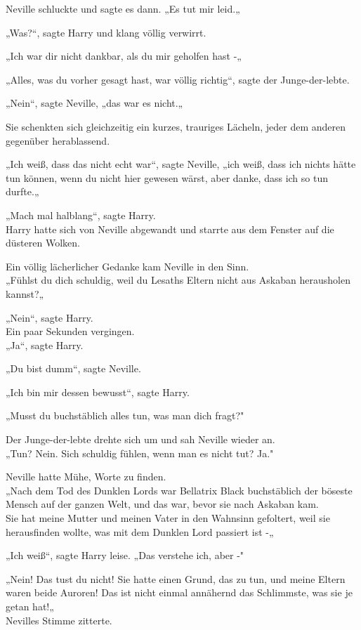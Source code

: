 {Neville schluckte und sagte es dann. „Es tut mir leid.„

„Was?“, sagte Harry und klang völlig verwirrt.

„Ich war dir nicht dankbar, als du mir geholfen hast -„

„Alles, was du vorher gesagt hast, war völlig richtig“, sagte der Junge-der-lebte.

„Nein“, sagte Neville, „das war es nicht.„

Sie schenkten sich gleichzeitig ein kurzes, trauriges Lächeln, jeder dem anderen gegenüber herablassend.

„Ich weiß, dass das nicht echt war“, sagte Neville, „ich weiß, dass ich nichts hätte tun können, wenn du nicht hier gewesen wärst, aber danke, dass ich so tun durfte.„

„Mach mal halblang“, sagte Harry.\\ Harry hatte sich von Neville abgewandt und starrte aus dem Fenster auf die düsteren Wolken.

Ein völlig lächerlicher Gedanke kam Neville in den Sinn.\\ „Fühlst du dich schuldig, weil du Lesaths Eltern nicht aus Askaban herausholen kannst?„

„Nein“, sagte Harry.\\ Ein paar Sekunden vergingen.\\ „Ja“, sagte Harry.

„Du bist dumm“, sagte Neville.

„Ich bin mir dessen bewusst“, sagte Harry.

„Musst du buchstäblich alles tun, was man dich fragt?"

Der Junge-der-lebte drehte sich um und sah Neville wieder an.\\ „Tun? Nein. Sich schuldig fühlen, wenn man es nicht tut? Ja."

Neville hatte Mühe, Worte zu finden.\\ „Nach dem Tod des Dunklen Lords war Bellatrix Black buchstäblich der böseste Mensch auf der ganzen Welt, und das war, bevor sie nach Askaban kam.\\ Sie hat meine Mutter und meinen Vater in den Wahnsinn gefoltert, weil sie herausfinden wollte, was mit dem Dunklen Lord passiert ist -„

„Ich weiß“, sagte Harry leise. „Das verstehe ich, aber -"

„Nein! Das tust du nicht! Sie hatte einen Grund, das zu tun, und meine Eltern waren beide Auroren! Das ist nicht einmal annähernd das Schlimmste, was sie je getan hat!„\\ Nevilles Stimme zitterte.

}
